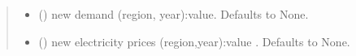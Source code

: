 \documentclass[letterpaper,10pt,english]{sphinxmanual}
\begin{document}
\begin{fulllineitems}
\begin{fulllineitems}
\begin{quote}
\begin{description}
\begin{itemize}
\item {} 
\sphinxAtStartPar
{} (\sphinxstyleliteralemphasis{\sphinxupquote{, }}) \textendash{} new demand (region, year):value. Defaults to None.

\item {} 
\sphinxAtStartPar
{} (\sphinxstyleliteralemphasis{\sphinxupquote{, }}) \textendash{} new electricity prices (region,year):value . Defaults to None.

\end{itemize}

\end{description}\end{quote}

\end{fulllineitems}


\end{fulllineitems}

\end{document}
